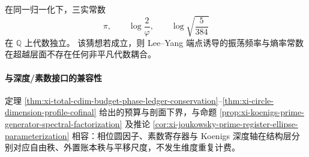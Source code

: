 \begin{conjecture}[对数奇点常数的超越独立性]\label{conj:xi-leyang-log-singularity-transcendence-independence}
在同一归一化下，三实常数
\[
\pi,\qquad
\log\!\frac{2}{\varphi},\qquad
\log\sqrt{\frac{5}{384}}
\]
在 \(\mathbb Q\) 上代数独立。
该猜想若成立，则 Lee--Yang 端点诱导的振荡频率与熵率常数在超越层面不存在任何非平凡代数耦合。
\end{conjecture}

\paragraph{与深度/素数接口的兼容性}
定理 \ref{thm:xi-total-cdim-budget-phase-ledger-conservation}--\ref{thm:xi-circle-dimension-profile-cofinal}
给出的预算与剖面下界，与命题 \ref{prop:xi-koenigs-prime-generator-spectral-factorization} 及推论 \ref{cor:xi-joukowsky-prime-register-ellipse-parameterization} 相容：相位圆因子、素数寄存器与 Koenigs 深度轴在结构层分别对应自由秩、外置账本秩与平移尺度，不发生维度重复计费。
\endinput
